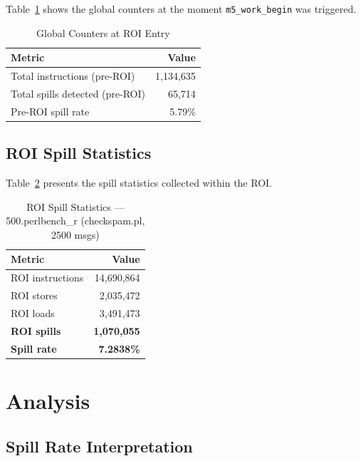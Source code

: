 \documentclass[conference]{IEEEtran}
\begin{document}
Table~\ref{tab:preroi} shows the global counters at the moment
\texttt{m5\_work\_begin} was triggered.

\begin{table}[H]
\centering
\caption{Global Counters at ROI Entry}
\label{tab:preroi}
\begin{tabular}{lr}
\toprule
\textbf{Metric} & \textbf{Value} \\
\midrule
Total instructions (pre-ROI) & 1,134,635 \\
Total spills detected (pre-ROI) & 65,714 \\
Pre-ROI spill rate & 5.79\% \\
\bottomrule
\end{tabular}
\end{table}

\subsection{ROI Spill Statistics}

Table~\ref{tab:roi} presents the spill statistics collected within
the ROI.

\begin{table}[H]
\centering
\caption{ROI Spill Statistics --- 500.perlbench\_r (checkspam.pl, 2500 msgs)}
\label{tab:roi}
\begin{tabular}{lr}
\toprule
\textbf{Metric} & \textbf{Value} \\
\midrule
ROI instructions         &  14,690,864 \\
ROI stores               &   2,035,472 \\
ROI loads                &   3,491,473 \\
\midrule
\textbf{ROI spills}      & \textbf{1,070,055} \\
\textbf{Spill rate}      & \textbf{7.2838\%} \\
\bottomrule
\end{tabular}
\end{table}

\section{Analysis}

\subsection{Spill Rate Interpretation}
\end{document}
